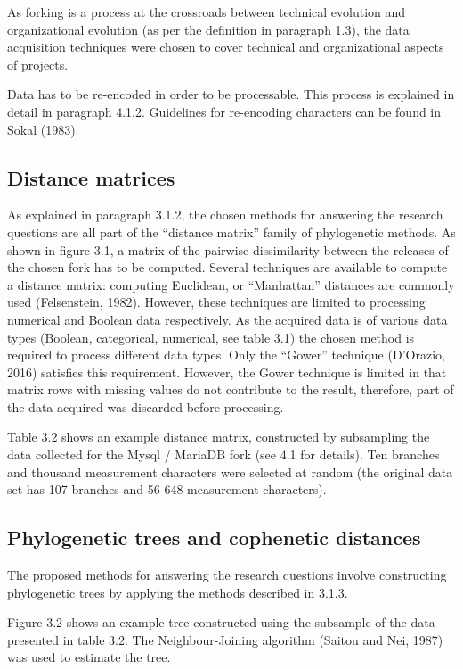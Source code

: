 As forking is a process at the crossroads between technical evolution and organizational evolution (as per the definition in paragraph 1.3), the data acquisition techniques were chosen to cover technical and organizational aspects of projects.

Data has to be re-encoded in order to be processable. This process is explained in detail in paragraph 4.1.2. Guidelines for re-encoding characters can be found in Sokal (1983).

\subsection{Distance matrices}
As explained in paragraph 3.1.2, the chosen methods for answering the research questions are all part of the “distance matrix” family of phylogenetic methods. As shown in figure 3.1, a matrix of the pairwise dissimilarity between the releases of the chosen fork has to be computed. Several techniques are available to compute a distance matrix: computing Euclidean, or “Manhattan” distances are commonly used (Felsenstein, 1982). However, these techniques are limited to processing numerical and Boolean data respectively. As the acquired data is of various data types (Boolean, categorical, numerical, see table 3.1) the chosen method is required to process different data types. Only the “Gower” technique (D'Orazio, 2016) satisfies this requirement. However, the Gower technique is limited in that matrix rows with missing values do not contribute to the result, therefore, part of the data acquired was discarded before processing.

Table 3.2 shows an example distance matrix, constructed by subsampling the data collected for the Mysql / MariaDB fork (see 4.1 for details). Ten branches and thousand measurement characters were selected at random (the original data set has 107 branches and 56 648 measurement characters).

\subsection{Phylogenetic trees and cophenetic distances}
The proposed methods for answering the research questions involve constructing phylogenetic trees by applying the methods described in 3.1.3.

Figure 3.2 shows an example tree constructed using the subsample of the data presented in table 3.2. The Neighbour-Joining algorithm (Saitou and Nei, 1987) was used to estimate the tree.

